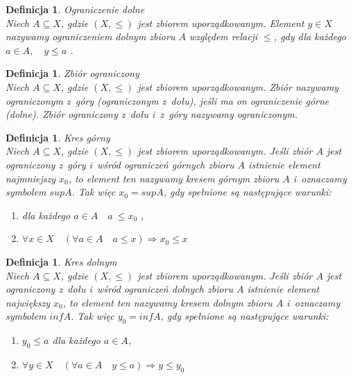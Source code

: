 \documentclass[12pt,a4paper]{report}
\newtheorem{definition}[theorem]{Definicja}
\begin{document}
\begin{definition}{Ograniczenie dolne \cite[Rozdział 2]{blaszczyk2007}}\\
Niech $A \subseteq X$, gdzie $(X, \leq)$ jest zbiorem uporządkowanym. Element $y \in X$ nazywamy ograniczeniem dolnym zbioru $A$ względem relacji $\leq$, gdy dla każdego $a \in A, \quad y \leq a$ . 
\end{definition}


\begin{definition}{Zbiór ograniczony \cite[Rozdział 2]{blaszczyk2007}}\\
Niech $A \subseteq X$, gdzie $(X, \leq)$ jest zbiorem uporządkowanym. Zbiór nazywamy ograniczonym z~góry (ograniczonym z~dołu), jeśli ma on ograniczenie górne (dolne). Zbiór ograniczony z~dołu i~z~góry nazywamy ograniczonym. 
\end{definition}


\begin{definition}{Kres górny \cite[Rozdział 2]{blaszczyk2007}}\\
Niech $A \subseteq X$, gdzie $(X, \leq)$ jest zbiorem uporządkowanym. Jeśli zbiór $A$ jest ograniczony z~góry i~wśród ograniczeń górnych zbioru $A$ istnienie element najmniejszy $x_0$, to element ten nazywamy kresem górnym zbioru $A$ i~oznaczamy symbolem $sup A$. Tak więc $x_0 =sup A$, gdy spełnione są następujące warunki:
\begin{enumerate}
\item dla każdego $a \in A \quad a~\leq x_0$ ,
\item $\forall x \in X \quad ( \forall a\in A  \quad a\leq x)  \Rightarrow x_0 \leq x$
\end{enumerate}
\end{definition}


\begin{definition}{Kres dolnym \cite[Rozdział 2]{blaszczyk2007}}\\
Niech $A \subseteq X$, gdzie $(X, \leq)$ jest zbiorem uporządkowanym. Jeśli zbiór $A$ jest ograniczony z~dołu i~wśród ograniczeń dolnych zbioru $A$ istnienie element największy $x_0$, to element ten nazywamy kresem dolnym zbioru $A$ i~oznaczamy symbolem $inf A$. Tak więc $y_0 =inf A$, gdy spełnione są następujące warunki:
\begin{enumerate}
\item $y_0 \leq a$ dla każdego $a \in A$,
\item $\forall y \in X \quad ( \forall a\in A  \quad y\leq a)  \Rightarrow y \leq y_0$
\end{enumerate}
\end{definition}
\end{document}

